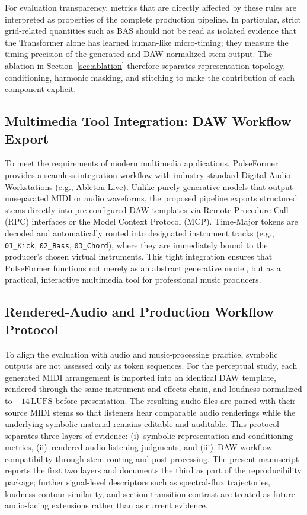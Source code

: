 \documentclass[pdflatex,sn-mathphys-num,twocolumn]{sn-jnl}
\theoremstyle{thmstyleone}
\theoremstyle{thmstyletwo}
\begin{document}
For evaluation transparency, metrics that are directly affected by these rules are interpreted as properties of the complete production pipeline. In particular, strict grid-related quantities such as BAS should not be read as isolated evidence that the Transformer alone has learned human-like micro-timing; they measure the timing precision of the generated and DAW-normalized stem output. The ablation in Section~\ref{sec:ablation} therefore separates representation topology, conditioning, harmonic masking, and stitching to make the contribution of each component explicit.

\subsection{Multimedia Tool Integration: DAW Workflow Export}
To meet the requirements of modern multimedia applications, PulseFormer provides a seamless integration workflow with industry-standard Digital Audio Workstations (e.g., Ableton Live). Unlike purely generative models that output unseparated MIDI or audio waveforms, the proposed pipeline exports structured stems directly into pre-configured DAW templates via Remote Procedure Call (RPC) interfaces or the Model Context Protocol (MCP). Time-Major tokens are decoded and automatically routed into designated instrument tracks (e.g., \texttt{01\_Kick}, \texttt{02\_Bass}, \texttt{03\_Chord}), where they are immediately bound to the producer's chosen virtual instruments. This tight integration ensures that PulseFormer functions not merely as an abstract generative model, but as a practical, interactive multimedia tool for professional music producers.

\subsection{Rendered-Audio and Production Workflow Protocol}
\label{sec:audio_workflow_protocol}

To align the evaluation with audio and music-processing practice, symbolic outputs are not assessed only as token sequences. For the perceptual study, each generated MIDI arrangement is imported into an identical DAW template, rendered through the same instrument and effects chain, and loudness-normalized to $-14\,\mathrm{LUFS}$ before presentation. The resulting audio files are paired with their source MIDI stems so that listeners hear comparable audio renderings while the underlying symbolic material remains editable and auditable. This protocol separates three layers of evidence: (i)~symbolic representation and conditioning metrics, (ii)~rendered-audio listening judgments, and (iii)~DAW workflow compatibility through stem routing and post-processing. The present manuscript reports the first two layers and documents the third as part of the reproducibility package; further signal-level descriptors such as spectral-flux trajectories, loudness-contour similarity, and section-transition contrast are treated as future audio-facing extensions rather than as current evidence.
\end{document}

